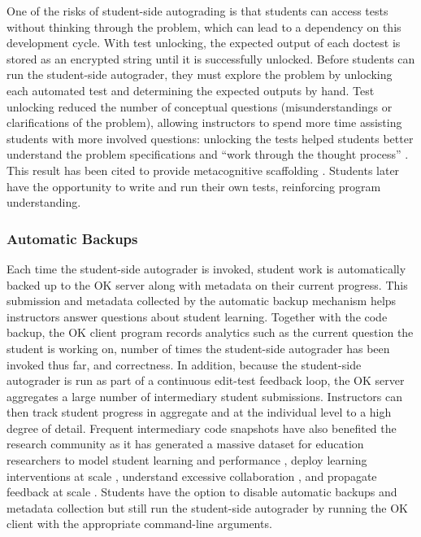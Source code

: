 One of the risks of student-side autograding is that students can access tests without thinking through the problem, which can lead to a dependency on this development cycle. With test unlocking, the expected output of each doctest is stored as an encrypted string until it is successfully unlocked. Before students can run the student-side autograder, they must explore the problem by unlocking each automated test and determining the expected outputs by hand. Test unlocking reduced the number of conceptual questions (misunderstandings or clarifications of the problem), allowing instructors to spend more time assisting students with more involved questions: unlocking the tests helped students better understand the problem specifications and ``work through the thought process'' \cite{Basu:2015}. This result has been cited to provide metacognitive scaffolding \cite{Prather:2019}. Students later have the opportunity to write and run their own tests, reinforcing program understanding.

\subsubsection{Automatic Backups}

Each time the student-side autograder is invoked, student work is automatically backed up to the OK server along with metadata on their current progress. This submission and metadata collected by the automatic backup mechanism helps instructors answer questions about student learning. Together with the code backup, the OK client program records analytics such as the current question the student is working on, number of times the student-side autograder has been invoked thus far, and correctness. In addition, because the student-side autograder is run as part of a continuous edit-test feedback loop, the OK server aggregates a large number of intermediary student submissions. Instructors can then track student progress in aggregate and at the individual level to a high degree of detail. Frequent intermediary code snapshots have also benefited the research community as it has generated a massive dataset for education researchers to model student learning and performance \cite{Piech:2012, Wang:2017, Liao:2019}, deploy learning interventions at scale \cite{Sridhara:2016, Phothilimthana:2017}, understand excessive collaboration \cite{Yan:2018}, and propagate feedback at scale \cite{Yan:2019, Glassman:2015}. Students have the option to disable automatic backups and metadata collection but still run the student-side autograder by running the OK client with the appropriate command-line arguments.

